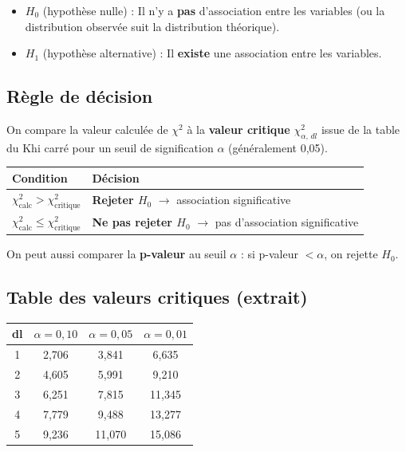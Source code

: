 \documentclass[12pt, a4paper]{article}
\begin{document}
\begin{itemize}
  \item $H_0$ (hypothèse nulle) : Il n'y a \textbf{pas} d'association entre les variables
        (ou la distribution observée suit la distribution théorique).
  \item $H_1$ (hypothèse alternative) : Il \textbf{existe} une association entre les
        variables.
\end{itemize}

\subsection{Règle de décision}

On compare la valeur calculée de $\chi^2$ à la \textbf{valeur critique}
$\chi^2_{\alpha,\,dl}$ issue de la table du Khi carré pour un seuil de signification
$\alpha$ (généralement 0,05).

\vspace{0.5em}
\begin{center}
\begin{tabular}{lp{7cm}}
  \toprule
  \textbf{Condition} & \textbf{Décision} \\
  \midrule
  $\chi^2_{\text{calc}} > \chi^2_{\text{critique}}$ &
    \textbf{Rejeter $H_0$} $\rightarrow$ association significative \\[4pt]
  $\chi^2_{\text{calc}} \leq \chi^2_{\text{critique}}$ &
    \textbf{Ne pas rejeter $H_0$} $\rightarrow$ pas d'association significative \\
  \bottomrule
\end{tabular}
\end{center}

\vspace{0.3em}
On peut aussi comparer la \textbf{p-valeur} au seuil $\alpha$ : si p-valeur $< \alpha$,
on rejette $H_0$.

\subsection{Table des valeurs critiques (extrait)}

\vspace{0.5em}
\begin{center}
\begin{tabular}{cccc}
  \toprule
  \textbf{dl} & $\alpha = 0{,}10$ & $\alpha = 0{,}05$ & $\alpha = 0{,}01$ \\
  \midrule
  1 & 2,706 & 3,841 &  6,635 \\
  2 & 4,605 & 5,991 &  9,210 \\
  3 & 6,251 & 7,815 & 11,345 \\
  4 & 7,779 & 9,488 & 13,277 \\
  5 & 9,236 & 11,070 & 15,086 \\
  \bottomrule
\end{tabular}
\end{center}
\end{document}
